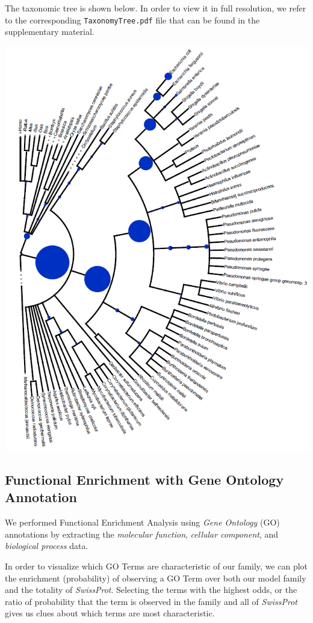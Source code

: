 \documentclass[10pt,twocolumn,letterpaper]{article}
\begin{document}
The taxonomic tree is shown below. In order to view it in full resolution, we refer to the corresponding \texttt{TaxonomyTree.pdf} file that can be found in the supplementary material.

\begin{center}
    \includegraphics[scale=0.4]{report/img/taxonomy_tree.png}
\end{center}

\subsection{Functional Enrichment with Gene Ontology Annotation}

We performed Functional Enrichment Analysis using \textit{Gene Ontology} (GO) annotations by extracting the \textit{molecular function}, \textit{cellular component}, and \textit{biological process} data.

In order to visualize which GO Terms are characteristic of our family, we can plot the enrichment (probability) of observing a GO Term over both our model family and the totality of \textit{SwissProt}. Selecting the terms with the highest odds, or the ratio of probability that the term is observed in the family and all of \textit{SwissProt} gives us clues about which terms are most characteristic. 
\end{document}
